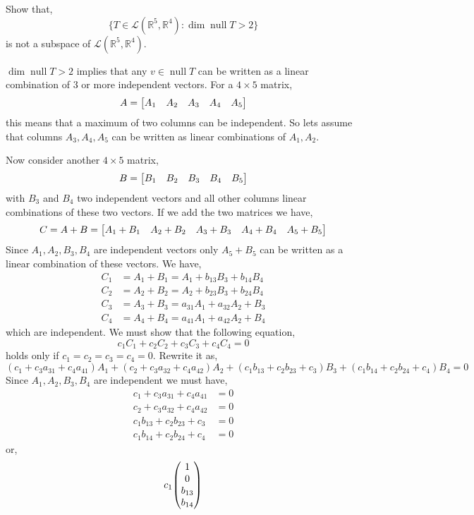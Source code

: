 \documentclass[11pt,a4paper]{scrartcl}
\DeclareMathOperator{\nspace}{null}
\newcommand{\lmap}[2]{\mathcal{L}(#1,#2)}
\newcommand{\RR}{\mathbb{R}}
\newcounter{problem}
\begin{document}
\begin{problem}[3.B.4]
    {
        Show that,
        \[
        \{ T \in \lmap{\RR^5}{\RR^4}: \dim \nspace T>2 \}    
        \] 
        is not a subspace of $\lmap{\RR^5}{\RR^4}$.
    }
    {
        $\dim \nspace T>2$ implies that any $v \in \nspace T$ can be written as a linear combination
        of 3 or more independent vectors. For a $4\times 5$ matrix,
        \[
            A = \mqty[A_1 & A_2 & A_3 & A_4 & A_5]
        \]  
        this means that a maximum of two columns can be independent. So lets assume that columns
        $A_3,A_4,A_5$ can be written as linear combinations of $A_1,A_2$.

        Now consider another $4\times 5$ matrix,
        \[
            B = \mqty[B_1 & B_2 & B_3 & B_4 & B_5]
        \]          
        with $B_3$ and $B_4$ two independent vectors and all other columns linear combinations of
        these two vectors. If we add the two matrices we have,
        \[
        C = A + B = \mqty[A_1+B_1 & A_2+B_2 & A_3+B_3 & A_4+B_4 & A_5+B_5]    
        \]
        Since $A_1, A_2, B_3, B_4$ are independent vectors only $A_5+B_5$ can be written as 
        a linear combination of these vectors. We have,
        \begin{align*}
            C_1 & = A_1 + B_1 = A_1 + b_{13} B_3 + b_{14} B_4 \\
            C_2 & = A_2 + B_2 = A_2 + b_{23} B_3 + b_{24} B_4 \\
            C_3 & = A_3 + B_3 = a_{31} A_1 + a_{32} A_2 + B_3 \\
            C_4 &= A_4 + B_4 = a_{41} A_1 + a_{42} A_2 + B_4
        \end{align*}
        which are independent. We must show that the following equation,
        \[
        c_1C_1+c_2C_2+c_3C_3+c_4C_4=0    
        \]
        holds only if $c_1=c_2=c_3=c_4=0$. Rewrite it as,
        \[
        (c_1+c_3a_{31}+c_4a_{41})A_1+ (c_2+c_3a_{32}+c_4a_{42})A_2
        +(c_1b_{13}+c_2b_{23}+c_3)B_3 + (c_1b_{14}+c_2b_{24}+c_4)B_4=0    
        \]
        Since $A_1,A_2,B_3,B_4$ are independent we must have,
        \begin{align*}
            c_1+c_3a_{31}+c_4a_{41} & = 0 \\
            c_2+c_3a_{32}+c_4a_{42} &= 0 \\
            c_1b_{13}+c_2b_{23}+c_3 &= 0 \\
            c_1b_{14}+c_2b_{24}+c_4 &= 0
        \end{align*}
        or,
        \[
        c_1 \mqty(1 \\ 0 \\ b_{13} \\ b_{14})
\]}
\end{problem}
\end{document}
